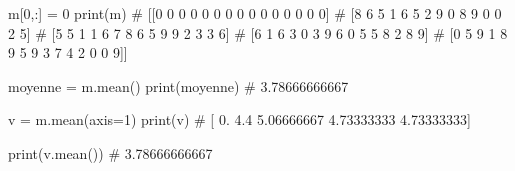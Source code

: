\documentclass[10pt,fleqn]{article} %
\begin{document}
\begin{multicols}{2}
\begin{corrige}
\begin{python}
m[0,:] = 0
print(m)
# [[0 0 0 0 0 0 0 0 0 0 0 0 0 0 0]
#  [8 6 5 1 6 5 2 9 0 8 9 0 0 2 5]
#  [5 5 1 1 6 7 8 6 5 9 9 2 3 3 6]
#  [6 1 6 3 0 3 9 6 0 5 5 8 2 8 9]
#  [0 5 9 1 8 9 5 9 3 7 4 2 0 0 9]]

moyenne = m.mean()
print(moyenne)
# 3.78666666667

v = m.mean(axis=1)
print(v)
# [ 0.          4.4         5.06666667  4.73333333  4.73333333]

print(v.mean())
# 3.78666666667
\end{python}
\end{corrige}
\else
\fi
%
%
%
%
%
%
%
%
%

\ifprof
\else
\end{multicols}
\fi
\end{document}

